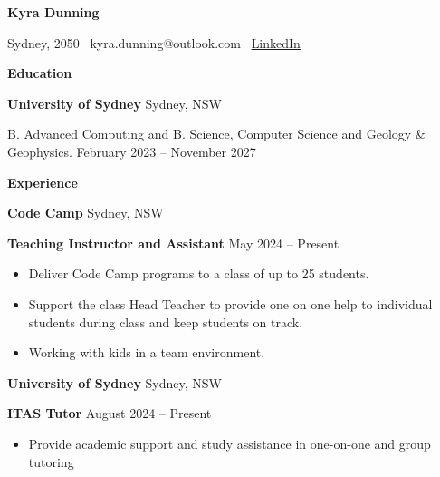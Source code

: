 \documentclass[11pt]{article}
\begin{document}
\begin{center}
    \textbf{Kyra Dunning}\\ 
    \hrulefill
\end{center}

\begin{center}
    Sydney, 2050 \textbullet \ kyra.dunning@outlook.com \textbullet \ \href{https://www.linkedin.com/in/kyra-dunning/}{LinkedIn}
\end{center}

\vspace{0.5pt}

\begin{center}
    \textbf{Education}\\
    \hrulefill
\end{center}
\textbf{University of Sydney} \hfill Sydney, NSW

B. Advanced Computing and B. Science,  
Computer Science and Geology \& Geophysics.
\hfill February 2023 – November 2027

\vspace{12pt}


\begin{center}
    \textbf{Experience}\\ 
    \hrulefill
\end{center}

\textbf{Code Camp} \hfill Sydney, NSW

\textbf{Teaching Instructor and Assistant} \hfill May 2024 – Present
\begin{itemize}[noitemsep, topsep=0pt, partopsep=0pt, parsep=0pt]
    \item Deliver Code Camp programs to a class of up to 25 students.
    \item Support the class Head Teacher to provide one on one help to individual students during class and keep students on track.
    \item Working with kids in a team environment.
\end{itemize}

\vspace{12pt} 

\textbf{University of Sydney} \hfill Sydney, NSW

\textbf{ITAS Tutor} \hfill August 2024 – Present
\begin{itemize}[noitemsep, topsep=0pt, partopsep=0pt, parsep=0pt]
    \item Provide academic support and study assistance in one-on-one and group tutoring
\end{itemize}
\end{document}

